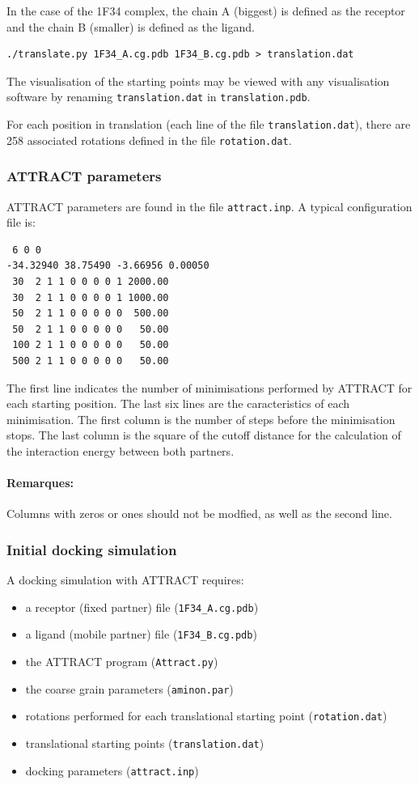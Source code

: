 \documentclass[12pt,a4paper]{article}
\begin{document}
In the case of the 1F34 complex, the chain A (biggest) is defined as the receptor
and the chain B (smaller) is defined as the ligand.
\begin{verbatim}
./translate.py 1F34_A.cg.pdb 1F34_B.cg.pdb > translation.dat
\end{verbatim}

The visualisation of the starting points may be viewed with any visualisation software by renaming {\tt translation.dat} in {\tt translation.pdb}.

For each position in translation (each line of the file {\tt translation.dat}), 
there are 258 associated rotations defined in the file {\tt rotation.dat}. 

\subsubsection{ATTRACT parameters}

ATTRACT parameters are found in the file {\tt attract.inp}. A typical configuration file is:
\begin{verbatim}
 6 0 0
-34.32940 38.75490 -3.66956 0.00050
 30  2 1 1 0 0 0 0 1 2000.00
 30  2 1 1 0 0 0 0 1 1000.00
 50  2 1 1 0 0 0 0 0  500.00
 50  2 1 1 0 0 0 0 0   50.00
 100 2 1 1 0 0 0 0 0   50.00
 500 2 1 1 0 0 0 0 0   50.00
\end{verbatim}

The first line indicates the number of minimisations performed by ATTRACT for each starting position. 
The last six lines are the caracteristics of each minimisation. The first column is the number of steps before the minimisation stops. 
The last column is the square of the cutoff distance for the calculation of the interaction energy between both partners.

\paragraph{Remarques:} Columns with zeros or ones should not be modfied, as well as the second line.

\subsubsection{Initial docking simulation}

A docking simulation with ATTRACT requires:
\begin{itemize}
\item a receptor (fixed partner) file ({\tt 1F34\_A.cg.pdb})
\item a ligand (mobile partner) file ({\tt 1F34\_B.cg.pdb})
\item the ATTRACT program ({\tt  Attract.py})
\item the coarse grain parameters ({\tt aminon.par})
\item rotations performed for each translational starting point ({\tt rotation.dat})
\item translational starting points ({\tt translation.dat})
\item docking parameters ({\tt attract.inp})
\end{itemize}
\end{document}
